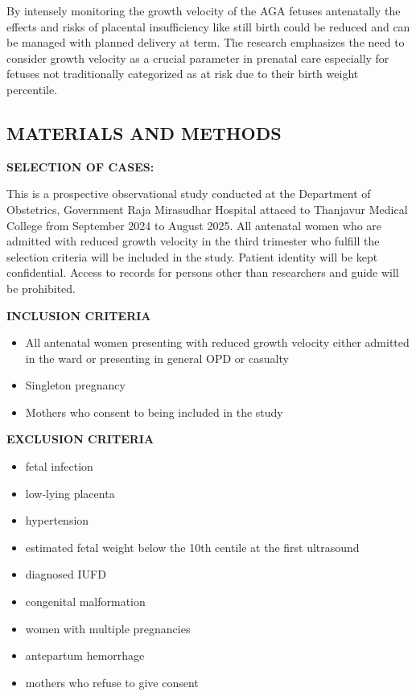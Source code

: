 \documentclass[14pt]{extarticle}
\begin{document}
By intensely monitoring the growth velocity of the AGA fetuses antenatally the effects and risks of placental insufficiency like still birth could be reduced and can be managed with planned delivery at term. The research emphasizes the need to consider growth velocity as a crucial parameter in prenatal care especially for fetuses not traditionally categorized as at risk due to their birth weight percentile.

\newpage

\null
\vfill
\begin{flushright}
    \section{MATERIALS AND METHODS}
\end{flushright}
\hrulefill
\newpage

\textbf{\large SELECTION OF CASES:} 

This is a prospective observational study conducted at the Department of Obstetrics, Government Raja Mirasudhar Hospital attaced to Thanjavur Medical College from September 2024 to August 2025. All antenatal women who are admitted with reduced growth velocity in the third trimester who fulfill the selection criteria will be included in the study. Patient identity will be kept confidential. Access to records for persons other than researchers and guide will be prohibited.

\textbf{\large INCLUSION CRITERIA}
\begin{itemize}
    \item All antenatal women presenting with reduced growth velocity either admitted in the ward or presenting in general OPD or casualty
    \item Singleton pregnancy
    \item Mothers who consent to being included in the study
\end{itemize}

\textbf{\large EXCLUSION CRITERIA}
\begin{itemize}
    \item fetal infection
    \item low-lying placenta
    \item hypertension
    \item estimated fetal weight below the 10th centile at the first ultrasound
    \item diagnosed IUFD
    \item congenital malformation
    \item women with multiple pregnancies
    \item antepartum hemorrhage 
    \item mothers who refuse to give consent 
\end{itemize}
\end{document}
